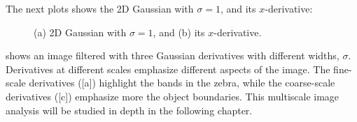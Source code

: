 The next plots shows the 2D Gaussian with $\sigma=1$, and its $x$-derivative:
\vspace{-.2in}
\begin{figure}[h] 
\centerline{
}
\caption{(a) 2D Gaussian with $\sigma=1$, and (b) its $x$-derivative.}
\end{figure}
\vspace{-.2in}


\Fig{\ref{fig:gaussiander_zebra}} shows an image filtered with three Gaussian derivatives with different widths, $\sigma$. Derivatives at different scales emphasize different aspects of the image. The fine-scale derivatives (\fig{\ref{fig:gaussiander_zebra}}[a]) highlight the bands in the zebra, while the coarse-scale derivatives (\fig{\ref{fig:gaussiander_zebra}}[c]) emphasize more the object boundaries. This multiscale image analysis will be studied in depth in the following chapter. 

